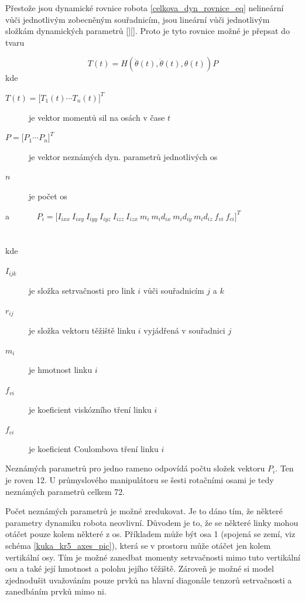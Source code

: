 Přestože jsou dynamické rovnice robota \ref{celkova_dyn_rovnice_eq} nelineární vůči jednotlivým zobecněným souřadnicím, jsou lineární vůči jednotlivým složkám dynamických parametrů [\cite{clos_dyn_par}][\cite{dyn_mod_ind}]. Proto je tyto rovnice možné je přepsat do tvaru

\begin{equation}
T(t) = H(\ddot{\theta}(t),\dot{\theta}(t),\theta(t))P
\label{eq_lin_par}
\end{equation}
kde
\begin{description}
\item[$T(t) = {\big[T_1(t)  \dotsm  T_n(t)\big]}^{T}$] je vektor momentů sil na osách v čase $t$ 
\item[$P = {\big[P_1  \dotsm  P_n\big]}^{T}$] je vektor neznámých dyn. parametrů jednotlivých os
\item[$n$] je počet os
\end{description} \noindent
a \ \ \ \ \ \ $P_i = {\big[I_{ixx} \ I_{ixy} \ I_{iyy} \ I_{iyz} \ I_{izz} \ I_{izx} \ m_i \ m_id_{ix} \ m_id_{iy} \ m_id_{iz} \ f_{vi} \ f_{ci}\big]}^{T}$ \\
\\
\\
kde
\noindent
\begin{description}
\item[$I_{ijk}$] je složka setrvačnosti pro link $i$ vůči souřadnicím $j$ a $k$
\item[$r_{ij}$] je složka vektoru těžiště linku $i$ vyjádřená v souřadnici $j$
\item[$m_{i}$] je hmotnost linku $i$
\item[$f_{vi}$] je koeficient viskózního tření linku $i$
\item[$f_{ci}$] je koeficient Coulombova tření linku $i$
\end{description}

Neznámých parametrů pro jedno rameno odpovídá počtu složek vektoru $P_i$. Ten je roven 12. U průmyslového manipulátoru se šesti rotačními osami je tedy neznámých parametrů celkem 72. 

Počet neznámých parametrů je možné zredukovat. Je to dáno tím, že některé parametry dynamiku robota neovlivní. Důvodem je to, že se některé linky mohou otáčet pouze kolem některé z os. Příkladem může být osa 1 (spojená se zemí, viz schéma \ref{kuka_kr5_axes_pic}), která se v prostoru může otáčet jen kolem vertikální osy. Tím je možné zanedbat momenty setrvačnosti mimo tuto vertikální osu a také její hmotnost a polohu jejího těžiště. Zároveň je možné si model zjednodušit uvažováním pouze prvků na hlavní diagonále tenzorů setrvačnosti a zanedbáním prvků mimo ni.

